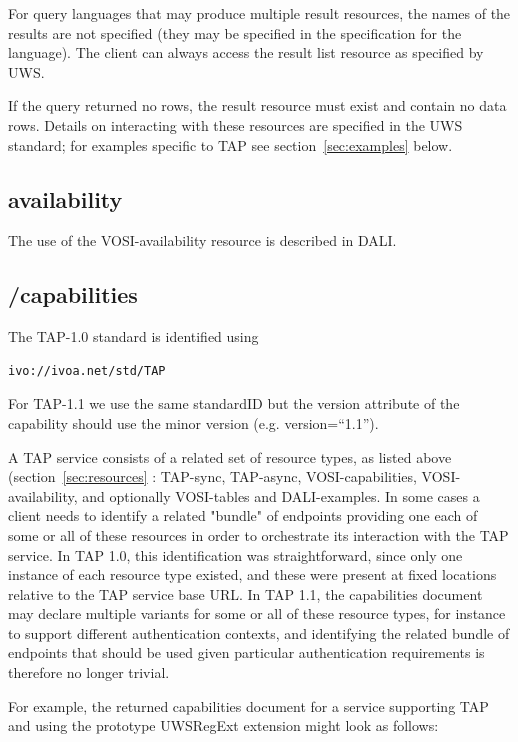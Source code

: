 \documentclass[11pt,letter]{ivoa}
\begin{document}
For query languages that may produce multiple result resources, the names of the 
results are not specified (they may be specified in the specification for the 
language). The client can always access the result list resource as specified by 
UWS.

If the query returned no rows, the result resource must exist and contain no 
data rows. Details on interacting with these resources are specified in the UWS 
standard; for examples specific to TAP see section~\ref{sec:examples} below.

\subsection{availability}
\label{sec:vosi-availability}

The use of the VOSI-availability resource is described in DALI.

\subsection{/capabilities}
\label{sec:vosi-capabilities}

The TAP-1.0 standard is identified using 
\begin{verbatim}
ivo://ivoa.net/std/TAP
\end{verbatim}

For TAP-1.1 we use the same standardID but the version attribute of the capability should
use the minor version (e.g. version=``1.1'').

A TAP service consists of a related set of resource types, as listed above (section~\ref{sec:resources} : TAP-sync, TAP-async, VOSI-capabilities, VOSI-availability, and optionally VOSI-tables and DALI-examples. In some cases a client needs to identify a related "bundle" of endpoints providing one each of some or all of these resources in order to orchestrate its interaction with the TAP service. In TAP 1.0, this identification was straightforward, since only one instance of each resource type existed, and these were present at fixed locations relative to the TAP service base URL. In TAP 1.1, the capabilities document may declare multiple variants for some or all of these resource types, for instance to support different authentication contexts, and identifying the related bundle of endpoints that should be used given particular authentication requirements is therefore no longer trivial. 

For example, the returned capabilities document for a service supporting TAP and using the prototype UWSRegExt \citep{note:UWSRegExt} extension might look as follows:
\end{document}
